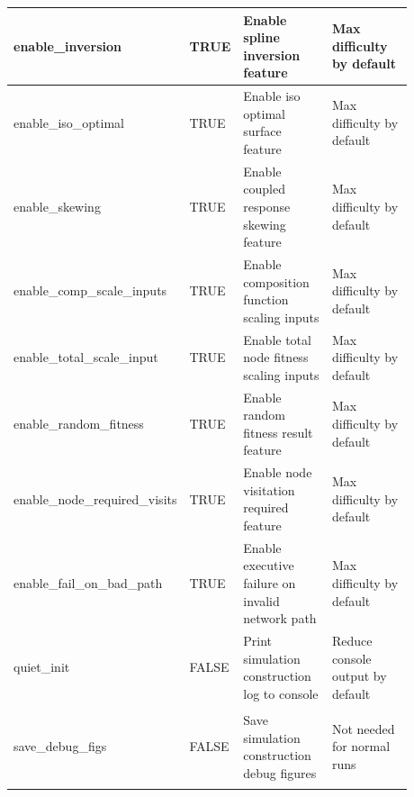 \begin{longtable}{| p{0.28\linewidth} | C{0.08\linewidth} | p{0.26\linewidth} | p{0.26\linewidth} | }
enable\_inversion & TRUE & Enable spline inversion feature & Max difficulty by default \\ \hline
enable\_iso\_optimal & TRUE & Enable iso optimal surface feature & Max difficulty by default \\ \hline
enable\_skewing & TRUE & Enable coupled response skewing feature & Max difficulty by default \\ \hline
enable\_comp\_scale\_inputs & TRUE & Enable composition function scaling inputs & Max difficulty by default \\ \hline
enable\_total\_scale\_input & TRUE & Enable total node fitness scaling inputs & Max difficulty by default \\ \hline
enable\_random\_fitness & TRUE & Enable random fitness result feature & Max difficulty by default \\ \hline
enable\_node\_required\_visits & TRUE & Enable node visitation required feature & Max difficulty by default \\ \hline
enable\_fail\_on\_bad\_path & TRUE & Enable executive failure on invalid network path & Max difficulty by default \\ \hline
quiet\_init & FALSE & Print simulation construction log to console & Reduce console output by default \\ \hline
save\_debug\_figs & FALSE & Save simulation construction debug figures & Not needed for normal runs


\label{tbl:sim-config} \\ \hline


\end{longtable}